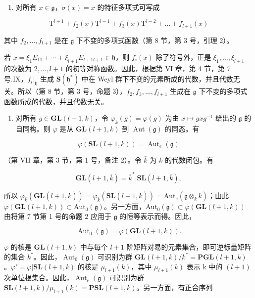 \begin{enumerate}
\def\labelenumi{(\Roman{enumi})}
\setcounter{enumi}{5}
\tightlist
\item
  对所有 \(x \in \mathfrak{g}\)，\(\sigma(x) = x\) 的特征多项式可写成
\end{enumerate}

\[
\mathrm{T} ^ {l + 1} + f _ {2} (x) \mathrm{T} ^ {l - 1} + f _ {3} (x) \mathrm{T} ^ {l - 2} + \dots + f _ {l + 1} (x)
\]

其中 \(f_{2}, \ldots, f_{l+1}\) 是在 \(\mathfrak{g}\) 下不变的多项式函数（第 8 节，第 3 号，引理 2）。

若 \(x = \xi_{1}E_{11} + \cdots + \xi_{l+1}E_{l+1 l+1} \in \mathfrak{h}\)，则 \(f_{i}(x)\) 除了符号外，正是 \(\xi_{1}, \ldots, \xi_{l+1}\) 的次数为 \(2, \ldots, l + 1\) 的初等对称函数。因此，根据第 VI 章，第 4 节，第 7 号.IX，\(f_{i}|_{\mathfrak{h}}\) 生成 \(\mathbf{S}(\mathfrak{h}^{*})\) 中在 Weyl 群下不变的元素所成的代数，并且代数无关。所以（第 8 节，第 3 号，命题 3），\(f_{2}, f_{3}, \ldots, f_{l+1}\) 生成在 \(\mathfrak{g}\) 下不变的多项式函数所成的代数，并且代数无关。

\begin{enumerate}
\def\labelenumi{(\Roman{enumi})}
\setcounter{enumi}{6}
\tightlist
\item
  对所有 \(g \in \mathbf{GL}(l + 1, k)\)，令 \(\varphi_k(g) = \varphi(g)\) 为由 \(x \mapsto gxg^{-1}\) 给出的 \(\mathfrak{g}\) 的自同构。则 \(\varphi\) 是从 \(\mathbf{GL}(l + 1, k)\) 到 \(\operatorname{Aut}(\mathfrak{g})\) 的同态。有
\end{enumerate}

\[
\varphi (\mathbf {S L} (l + 1, k)) = \operatorname{Aut} _ {e} (\mathfrak {g})
\]

（第 VII 章，第 3 节，第 1 号，备注 2）。令 \(\bar{k}\) 为 \(k\) 的代数闭包。有

\[
\mathbf {G L} (l + 1, \bar {k}) = \bar {k} ^ {*}. \mathbf {S L} (l + 1, \bar {k}),
\]

所以 \(\varphi_{\bar{k}}(\mathbf{GL}(l + 1,\bar{k})) = \varphi_{\bar{k}}(\mathbf{SL}(l + 1,\bar{k})) = \mathrm{Aut}_e(\mathfrak{g}\otimes_k\bar{k})\)；由此 \(\varphi (\mathbf{GL}(l + 1,k))\subset \mathrm{Aut}_0(\mathfrak{g})\)。另一方面，\(\mathrm{Aut}_0(\mathfrak{g})\subset \varphi (\mathbf{GL}(l + 1,k))\) 由将第 7 节第 1 号的命题 2 应用于 \(\mathfrak{g}\) 的恒等表示而得。因此，

\[
\operatorname{Aut} _ {0} (\mathfrak {g}) = \varphi (\mathbf {G L} (l + 1, k)).
\]

 \(\varphi\) 的核是 \(\mathbf{GL}(l+1,k)\) 中与每个 \(l+1\) 阶矩阵对易的元素集合，即可逆标量矩阵的集合 \(k^{*}\)。因此，\(\operatorname{Aut}_{0}(\mathfrak{g})\) 可识别为群 \(\mathbf{GL}(l+1,k)/k^{*}=\mathbf{PGL}(l+1,k)\)。\(\varphi'=\varphi|\mathbf{SL}(l+1,k)\) 的核是 \(\mu_{l+1}(k)\)，其中 \(\mu_{l+1}(k)\) 表示 k 中的 \((l+1)\) 次单位根集合。因此，\(\operatorname{Aut}_{e}(\mathfrak{g})\) 可识别为群 \(\mathbf{SL}(l+1,k)/\mu_{l+1}(k)=\mathbf{PSL}(l+1,k)\)。另一方面，有正合序列

